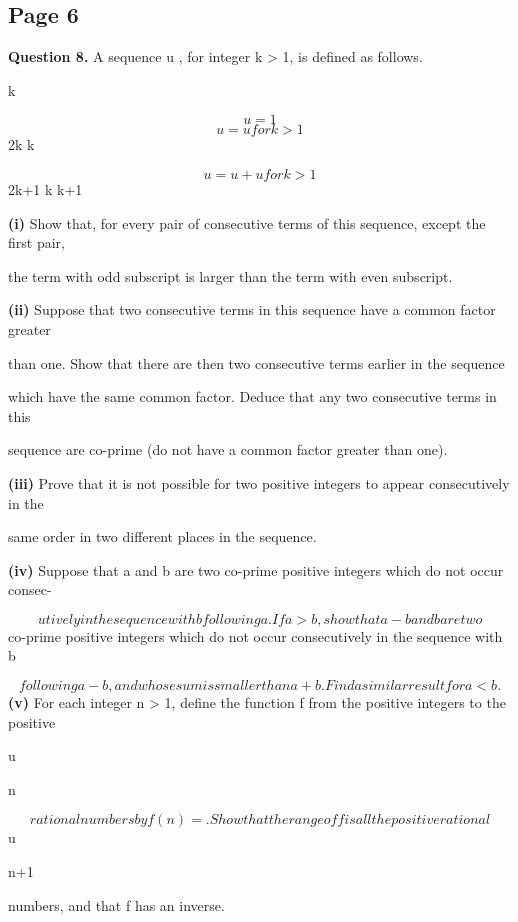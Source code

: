 \documentclass[12pt]{article}
\begin{document}
\subsection*{Page 6}
\begin{flushleft}
\bigskip\textbf{Question 8.} A sequence u , for integer k > 1, is defined as follows.\par
k\par
\[u = 1\]
\[u = u for k > 1\]
2k k\par
\[u = u + u for k > 1\]
2k+1 k k+1\par
\textbf{(i)} Show that, for every pair of consecutive terms of this sequence, except the first pair,\par
the term with odd subscript is larger than the term with even subscript.\par
\textbf{(ii)} Suppose that two consecutive terms in this sequence have a common factor greater\par
than one. Show that there are then two consecutive terms earlier in the sequence\par
which have the same common factor. Deduce that any two consecutive terms in this\par
sequence are co-prime (do not have a common factor greater than one).\par
\textbf{(iii)} Prove that it is not possible for two positive integers to appear consecutively in the\par
same order in two different places in the sequence.\par
\textbf{(iv)} Suppose that a and b are two co-prime positive integers which do not occur consec-\par
\[utively in the sequence with b following a. If a > b, show that a - b and b are two\]
co-prime positive integers which do not occur consecutively in the sequence with b\par
\[following a - b, and whose sum is smaller than a + b. Find a similar result for a < b.\]
\textbf{(v)} For each integer n > 1, define the function f from the positive integers to the positive\par
u\par
n\par
\[rational numbers by f(n) = . Show that the range of f is all the positive rational\]
u\par
n+1\par
numbers, and that f has an inverse.\par
\end{flushleft}
\end{document}
